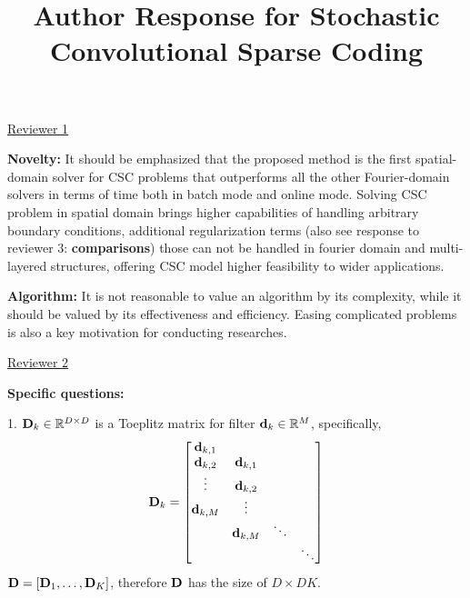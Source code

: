 \documentclass[10pt,twocolumn,letterpaper]{article}
\begin{document}
\title{Author Response for Stochastic Convolutional Sparse Coding}  %

\maketitle
\thispagestyle{empty}

\underline{Reviewer 1}

\textbf{Novelty:}
It should be emphasized that the proposed method is the first spatial-domain solver for CSC problems that outperforms all the other Fourier-domain solvers in terms of time both in batch mode and online mode. Solving CSC problem in spatial domain brings higher capabilities of handling arbitrary boundary conditions, additional regularization terms (also see response to reviewer 3: \textbf{comparisons}) those can not be handled in fourier domain and multi-layered structures, offering CSC model higher feasibility to wider applications.

\textbf{Algorithm:}
It is not reasonable to value an algorithm by its complexity, while it should be valued by its effectiveness and efficiency. Easing complicated problems is also a key motivation for conducting researches.

\underline{Reviewer 2}

\textbf{Specific questions:}

1. $\Filter_k \in \mathbb{R}^{D \times D}$ is a Toeplitz matrix for filter $\filter_k \in \mathbb{R}^{M}$, specifically,
\begin{equation}\label{toeplitz}
 \Filter_k =
 \begin{bmatrix}
    \filter_{k,1} \\
    \filter_{k,2} & \filter_{k,1}\\
    \vdots        & \filter_{k,2}\\
    \filter_{k,M} & \vdots       \\
                  & \filter_{k,M} & \ddots\\
                  &               &        & \ddots          
  \end{bmatrix}
\end{equation}
$\Filter = [\Filter_1, \dots, \Filter_K]$, therefore $\Filter$ has the size of $D \times DK$.
\end{document}
